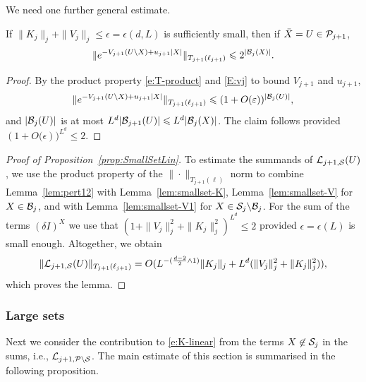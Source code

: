 \documentclass[11pt]{amsart}
\numberwithin{equation}{section}
\numberwithin{theorem}{section}
\newcommand{\1}{{\bf 1}}
\newcommand{\dplus}{(\frac{d-2}{2} \wedge 1)}
\begin{document}
We need one further general estimate.
\begin{lemma}
    \label{lem:pert12}
    If $\|K_j\|_j + \|V_j\|_j \leq\epsilon=\epsilon(d,L)$ is
    sufficiently small, then if $\bar X = U \in \mathcal P_{j+1}$,
    \begin{equation}
      \label{e:pert12}
      \|e^{-V_{j+1}(U\setminus X)+u_{j+1}|X|}\|_{T_{j+1}(\ell_{j+1})}
      \leqslant 2^{|\mathcal B_{j}(X)|}.
    \end{equation}
  \end{lemma}
  \begin{proof}
    By the product property \eqref{e:T-product}  and \eqref{E:vj} to bound $V_{j+1}$ and $u_{j+1}$,
  \begin{equation}
     \|e^{-V_{j+1}(U\setminus X)+u_{j+1}|X|}\|_{T_{j+1}(\ell_{j+1})} \leqslant (1+{ O(}\varepsilon))^{|\mathcal B_{j}(U)|}, 
  \end{equation}
  and $|\mathcal B_{j}(U)|$ is at most $L^{d}|\mathcal B_{j+1}(U)|\leqslant
  L^{d}|\mathcal B_{j}(X)|$. The claim follows provided $(1+{ O(}\epsilon))^{L^{d}}\leq 2$.
\end{proof}

\begin{proof}[Proof of Proposition~\ref{prop:SmallSetLin}] To
    estimate the summands of $\mathcal L_{j+1, \mathcal S}(U)$, we use the product
    property of the $\|\cdot\|_{T_{j+1}(\ell)}$ norm to combine
    Lemma~\ref{lem:pert12} with Lemma~\ref{lem:smallset-K},
    Lemma~\ref{lem:smallset-V} for $X\in \mathcal B_j$, and with
    Lemma~\ref{lem:smallset-V1} for $X\in \mathcal S_{j}\backslash \mathcal B_j$.
    For the sum of the terms $(\delta I)^{X}$ we use that
    $(1+\|V_{j}\|_{j}^{2} + \|K_{j}\|_{j}^{2})^{L^{d}}\leq 2$ provided
    $\epsilon=\epsilon(L)$ is small enough.  Altogether, we obtain
\begin{equation}
\| \cL_{j+1, \cS}(U)\|_{T_{j+1}(\ell_{j+1})}= O(L^{-\dplus} \|K_j\|_j+L^{d}(\|V_j\|_j^2 + \|K_j\|_j^2)),
\end{equation}
which proves the lemma.
\end{proof}

\subsubsection{Large sets}
\label{sec:K-largeset}

Next we consider the contribution to \eqref{e:K-linear} from the terms
$X \not\in \mathcal S_j$ in the sums, i.e., $\mathcal L_{j+1,\mathcal P\setminus\mathcal S}$.
The main estimate of this section is summarised in the following proposition.
\end{document}
